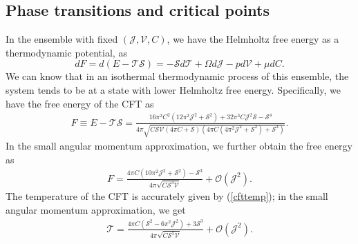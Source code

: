 \documentclass[a4paper,11pt]{article}
\newcommand{\eq}[1]{(\ref{#1})}
\def\T{\mathcal{T}} \def\O{\mathcal{O}} \def\S{\mathcal{S}}\def\J{\mathcal{J}}\def\V{\mathcal{V}}\def\Q{\mathcal{Q}}\def\F{\mathcal{F}}
\begin{document}
\subsection{Phase transitions and critical points}
In the ensemble with fixed $(\J, \mathcal{V}, C)$, we have the Helmholtz free energy as a thermodynamic potential, as 
\begin{equation}
dF=d(E-\T\S)=-\S d \T+\Omega d \J-p d \mathcal{V}+\mu d C.
\end{equation}
We can know that in an isothermal thermodynamic process of this ensemble, the system tends to be at a state with lower Helmholtz free energy. Specifically, we have the free energy of the  CFT as
\begin{equation}\label{helfrc}
\begin{aligned}
F \equiv E-\T \S=\frac{16 \pi ^2 C^2 \left(12 \pi ^2 \mathcal{J}^2+\mathcal{S}^2\right)+32 \pi ^3 C \mathcal{J}^2 \mathcal{S}-\mathcal{S}^4}{4 \pi  \sqrt{C \mathcal{S} \mathcal{V} (4 \pi  C+\mathcal{S}) \left(4 \pi  C \left(4 \pi ^2 \mathcal{J}^2+\mathcal{S}^2\right)+\mathcal{S}^3\right)}}.
\end{aligned}
\end{equation}
In the small angular momentum approximation, we further obtain the free energy as
\begin{equation}
\begin{aligned}
F=\frac{4 \pi  C \left(10 \pi ^2 \mathcal{J}^2+\mathcal{S}^2\right)-\mathcal{S}^3}{4 \pi  \sqrt{C \mathcal{S}^3 \mathcal{V}}}+\mathcal{O}(\J^2).
\end{aligned}
\end{equation}
The temperature of the CFT is accurately given by \eq{cfttemp}; in the small angular momentum approximation, we get 
\begin{equation}\label{tempjvc}
\begin{aligned}
\T =\frac{4 \pi  C \left(\mathcal{S}^2-6 \pi ^2 \mathcal{J}^2\right)+3 \mathcal{S}^3}{4 \pi  \sqrt{C \mathcal{S}^5 \mathcal{V}}}+\mathcal{O}(\J^2).
\end{aligned}
\end{equation}
\end{document}
